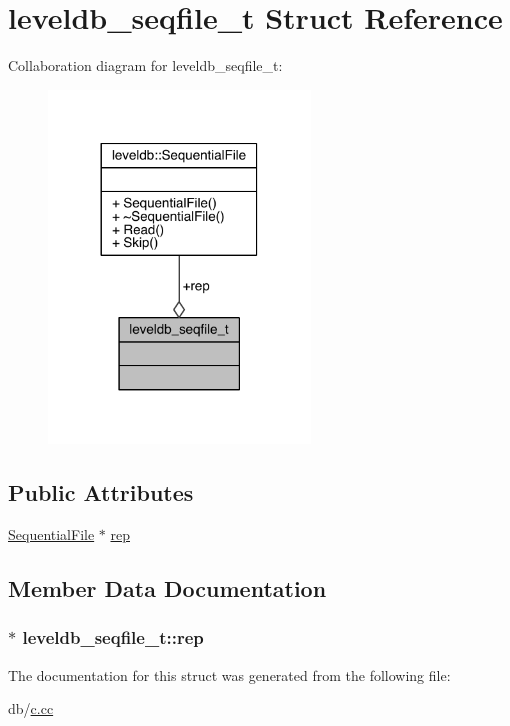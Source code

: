 \hypertarget{structleveldb__seqfile__t}{}\section{leveldb\+\_\+seqfile\+\_\+t Struct Reference}
\label{structleveldb__seqfile__t}


Collaboration diagram for leveldb\+\_\+seqfile\+\_\+t\+:\nopagebreak
\begin{figure}[H]
\begin{center}
\leavevmode
\includegraphics[width=197pt]{structleveldb__seqfile__t__coll__graph}
\end{center}
\end{figure}
\subsection*{Public Attributes}
\begin{DoxyCompactItemize}
\item 
\hyperlink{classleveldb_1_1_sequential_file}{Sequential\+File} $\ast$ \hyperlink{structleveldb__seqfile__t_a84b4a8638a6ad109e65b3c7923fde915}{rep}
\end{DoxyCompactItemize}


\subsection{Member Data Documentation}
\hypertarget{structleveldb__seqfile__t_a84b4a8638a6ad109e65b3c7923fde915}{}
\subsubsection[{rep}]{$\ast$ leveldb\+\_\+seqfile\+\_\+t\+::rep}\label{structleveldb__seqfile__t_a84b4a8638a6ad109e65b3c7923fde915}


The documentation for this struct was generated from the following file\+:\begin{DoxyCompactItemize}
\item 
db/\hyperlink{c_8cc}{c.\+cc}\end{DoxyCompactItemize}
